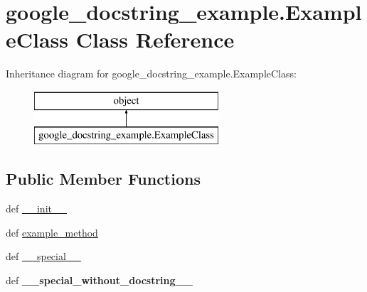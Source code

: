 \hypertarget{classgoogle__docstring__example_1_1ExampleClass}{\section{google\+\_\+docstring\+\_\+example.\+Example\+Class Class Reference}
\label{classgoogle__docstring__example_1_1ExampleClass}
}
Inheritance diagram for google\+\_\+docstring\+\_\+example.\+Example\+Class\+:\begin{figure}[H]
\begin{center}
\leavevmode
\includegraphics[height=2.000000cm]{classgoogle__docstring__example_1_1ExampleClass}
\end{center}
\end{figure}
\subsection*{Public Member Functions}
\begin{DoxyCompactItemize}
\item 
def \hyperlink{classgoogle__docstring__example_1_1ExampleClass_a6fde9c776090979b1bdd97ab905cdebf}{\+\_\+\+\_\+init\+\_\+\+\_\+}
\item 
def \hyperlink{classgoogle__docstring__example_1_1ExampleClass_aa1788edcf36597ca202110e4f1e540a1}{example\+\_\+method}
\item 
def \hyperlink{classgoogle__docstring__example_1_1ExampleClass_a1d452ef6f6945b82952f17b1b2948ddc}{\+\_\+\+\_\+special\+\_\+\+\_\+}
\item 
\hypertarget{classgoogle__docstring__example_1_1ExampleClass_a32c333c513d78d5b1af25b9d2f0494d2}{def {\bfseries \+\_\+\+\_\+special\+\_\+without\+\_\+docstring\+\_\+\+\_\+}}\label{classgoogle__docstring__example_1_1ExampleClass_a32c333c513d78d5b1af25b9d2f0494d2}

\end{DoxyCompactItemize}
